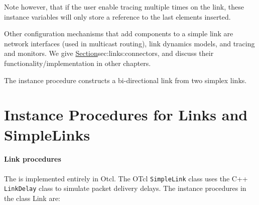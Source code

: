 Note however, that if the user enable tracing multiple times on the link,
these instance variables will only store a reference to the
last elements inserted.

Other configuration mechanisms that add components to a simple link
are network interfaces (used in multicast routing), 
link dynamics models, and tracing and monitors.
We give 
\href{a brief overview of the related objects at the end of this chapter}{%
		Section}{sec:links:connectors},
and discuss their functionality/implementation in other chapters.

The instance procedure
constructs a bi-directional link from two simplex links.

\section{Instance Procedures for Links and SimpleLinks}
\label{sec:links:components}

\paragraph{Link procedures}
The  is implemented entirely in Otcl.
The OTcl {\tt SimpleLink} class uses the C++ {\tt LinkDelay} class
to simulate packet delivery delays.
The instance procedures in the class Link are:

